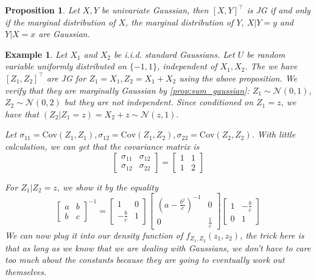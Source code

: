 \documentclass{article}
\newtheorem{example}{Example}
\newtheorem{proposition}{Proposition}
\DeclareMathOperator*{\1}{\mathbbm{1}}
\newcommand{\cN}{\mathcal{N}}
\theoremstyle{definition}
\theoremstyle{remark}
\begin{document}
  \begin{proposition}
    Let $X,Y$ be univariate Gaussian, then $[X,Y]^\top$ is JG if and only if the marginal distribution of $X$, the marginal distribution of $Y$, $X|Y=y$ and $Y|X=x$ are Gaussian.
  \end{proposition}
  \begin{example}
    Let $X_1$ and $X_2$ be i.i.d. standard Gaussians.  Let $U$ be random variable uniformly distributed on $\{-1,1\}$, independent of $X_1,X_2$. The we have $[Z_1,Z_2]^\top$ are JG for $Z_1=X_1,Z_2=X_1+X_2$ using the above proposition. We verify that they are marginally Gaussian by \cref{prop:sum_gaussian}: $Z_1\sim \cN(0,1)$, $Z_2\sim \cN(0,2)$ but they are not independent. Since conditioned on $Z_1=z$, we have that $(Z_2\vert Z_1=z)=X_2+z\sim\cN(z,1)$. 
    
    Let $\sigma_{11}=\mathrm{Cov}(Z_1,Z_1),\sigma_{12}=\mathrm{Cov}(Z_1,Z_2),\sigma_{22}=\mathrm{Cov}(Z_2,Z_2)$. With little calculation, we can get that the covariance matrix is
    \begin{equation*}
      \begin{bmatrix}
        \sigma_{11} & \sigma_{12}\\
        \sigma_{12} & \sigma_{22}
      \end{bmatrix}=
      \begin{bmatrix}
        1 & 1\\
        1 & 2
      \end{bmatrix}
    \end{equation*}
    
    For $Z_1\vert Z_2=z$, we show it by the equality
    \begin{equation*}
      \begin{bmatrix}
        a & b\\
        b & c
        \end{bmatrix}
        ^{-1}=
        \begin{bmatrix}
          1 & 0\\
          -\frac{b}{c} & 1
          \end{bmatrix}
          \begin{bmatrix}
            \left(a-\frac{b^2}{c}\right)^{-1} & 0\\
            0& \frac{1}{c}
            \end{bmatrix}
            \begin{bmatrix}
              1 & -\frac{b}{c}\\
              0& 1
              \end{bmatrix}
    \end{equation*}
    We can now plug it into our density function of $f_{Z_1,Z_2}(z_1,z_2)$, the trick here is that as long as we know that we are dealing with Gaussians, we don't have to care too much about the constants because they are going to eventually work out themselves.
    \end{example}
\end{document}
